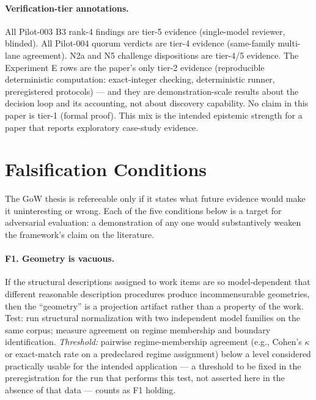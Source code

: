 \documentclass[11pt]{article}
\theoremstyle{gowthm}
\theoremstyle{gowplain}
\begin{document}
\paragraph{Verification-tier annotations.}
All Pilot-003 B3 rank-4 findings are tier-5 evidence (single-model reviewer,
blinded). All Pilot-004 quorum verdicts are tier-4 evidence (same-family
multi-lane agreement). N2a and N5 challenge dispositions are tier-4/5 evidence.
The Experiment E rows are the paper's only tier-2 evidence (reproducible
deterministic computation: exact-integer checking, deterministic runner,
preregistered protocols) --- and they are demonstration-scale results about
the decision loop and its accounting, not about discovery capability. No
claim in this paper is tier-1 (formal proof). This mix is the intended
epistemic strength for a paper that reports exploratory case-study evidence.

\section{Falsification Conditions}
\label{app:falsification}

The GoW thesis is refereeable only if it states what future evidence would
make it uninteresting or wrong. Each of the five conditions below is a target
for adversarial evaluation: a demonstration of any one would substantively
weaken the framework's claim on the literature.

\paragraph{F1. Geometry is vacuous.}
If the structural descriptions assigned to work items are so model-dependent
that different reasonable description procedures produce incommensurable
geometries, then the ``geometry'' is a projection artifact rather than a
property of the work. Test: run structural normalization with two independent
model families on the same corpus; measure agreement on regime membership and
boundary identification. \emph{Threshold:} pairwise regime-membership
agreement (e.g., Cohen's $\kappa$ or exact-match rate on a predeclared regime
assignment) below a level considered practically usable for the intended
application --- a threshold to be fixed in the preregistration for the run
that performs this test, not asserted here in the absence of that data ---
counts as F1 holding.
\end{document}
